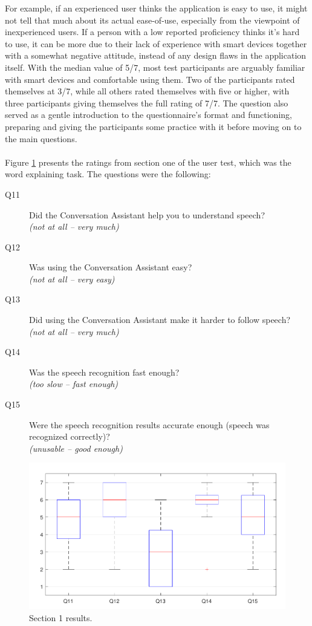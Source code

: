 \documentclass[english, 12pt, a4paper, pdftex, elec, utf8]{aaltothesis}
\begin{document}
For example, if an experienced user thinks the application is easy to use, it might not tell that much about its actual ease-of-use, especially from the viewpoint of inexperienced users. If a person with a low reported proficiency thinks it's hard to use, it can be more due to their lack of experience with smart devices together with a somewhat negative attitude, instead of any design flaws in the application itself. With the median value of 5/7, most test participants are arguably familiar with smart devices and comfortable using them. Two of the participants rated themselves at 3/7, while all others rated themselves with five or higher, with three participants giving themselves the full rating of 7/7. The question also served as a gentle introduction to the questionnaire's format and functioning, preparing and giving the participants some practice with it before moving on to the main questions. \\\\
Figure \ref{fig:results2} presents the ratings from section one of the user test, which was the word explaining task. The questions were the following:
\begin{description}
	\item[Q11] Did the Conversation Assistant help you to understand speech? \\ \textit{(not at all -- very much)}
	\item[Q12] Was using the Conversation Assistant easy? \\ \textit{(not at all -- very easy)}
	\item[Q13] Did using the Conversation Assistant make it harder to follow speech? \\ \textit{(not at all -- very much)}
	\item[Q14] Was the speech recognition fast enough? \\ \textit{(too slow -- fast enough)}
	\item[Q15] Were the speech recognition results accurate enough (speech was recognized correctly)? \\ \textit{(unusable -- good enough)}
\end{description}
\begin{figure}[h!]
	\centering
	\includegraphics[width=\textwidth]{T2_box2.pdf}
	\caption{Section 1 results.}
	\label{fig:results2} 
\end{figure}
\end{document}
